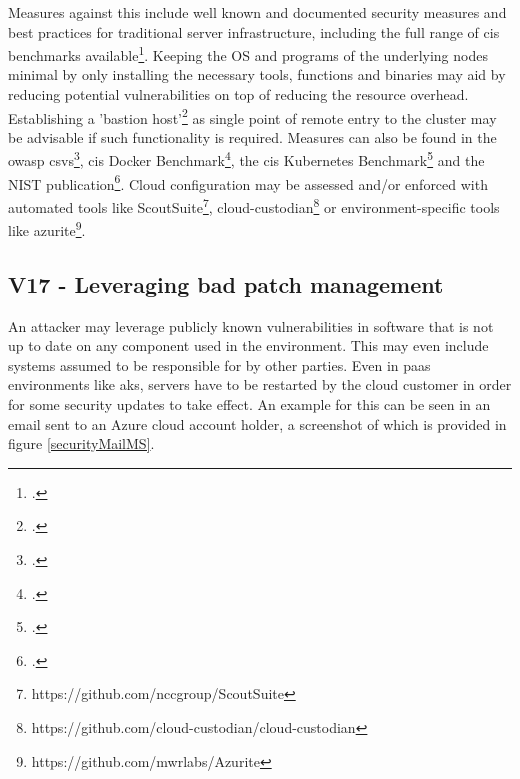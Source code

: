 Measures against this include well known and documented security measures and best practices for traditional server infrastructure, including the full range of \gls{cis} benchmarks available\footcite[][, refer to the list presented]{cisBenchmarkList}.
Keeping the OS and programs of the underlying nodes minimal by only installing the necessary tools, functions and binaries may aid by reducing potential vulnerabilities on top of reducing the resource overhead.
Establishing a 'bastion host'\footcite[][, section 'What is a bastion host, and do I need one?']{bastionHostAws} as single point of remote entry to the cluster may be advisable if such functionality is required.
Measures can also be found in the \gls{owasp} \gls{csvs}\footcite[][, section 'Infrastructure']{csvsGithub}, \gls{cis} Docker Benchmark\footcite[][, chapters 1 through 3 and 5]{cisDocker}, the \gls{cis} Kubernetes Benchmark\footcite[][, chapters 'Worker Node Security Configuration' and 'Configuration Files']{cisK8s} and the NIST publication\footcite[][, chapters 3.5, 4.5 and 4.6]{nistK8s}.
Cloud configuration may be assessed and/or enforced with automated tools like ScoutSuite\footnote{https://github.com/nccgroup/ScoutSuite}, cloud-custodian\footnote{https://github.com/cloud-custodian/cloud-custodian} or environment-specific tools like azurite\footnote{https://github.com/mwrlabs/Azurite}.

\subsection{V17 - Leveraging bad patch management} \label{v17}
An attacker may leverage publicly known vulnerabilities in software that is not up to date on any component used in the environment.
This may even include systems assumed to be responsible for by other parties. Even in \gls{paas} environments like \gls{aks}, servers have to be restarted by the cloud customer in order for some security updates to take effect. An example for this can be seen in an email sent to an Azure cloud account holder, a screenshot of which is provided in figure \ref{securityMailMS}.

